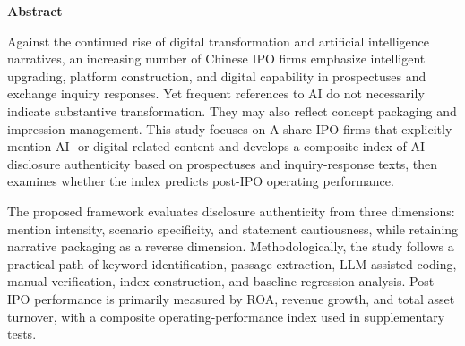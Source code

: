 \begin{abstract}
在数字化转型与人工智能热潮持续升温的背景下，越来越多 IPO 企业在招股说明书和交易所问询回复中强调自身的智能化、平台化与数字化能力。然而，企业对 AI 与数字化的高频表述究竟反映了真实转型能力，还是更多体现为概念化包装和叙事修辞，仍缺乏细化识别。围绕这一问题，本文拟以 A 股 IPO 企业中明确提及 AI 或数字化内容的企业为研究对象，结合招股说明书与问询回复文本，构建企业 AI 相关披露真实性综合指数，并检验其对上市后经营表现的影响。

具体而言，本文从提及强度、场景具体性和表述审慎性三个维度刻画企业 AI 披露的真实性，并保留叙事包装性这一反向面向，形成“真实性-包装性”双面识别框架。方法上，本文采用“关键词识别-相关段落抽取-LLM 辅助标注-人工复核-指数构建-基础回归验证”的技术路线，其中 LLM 主要承担摘要、标签建议与初步评分任务，关键标签由人工复核确认。经营表现主要从 ROA、营业收入增长率和总资产周转率三个维度衡量，并进一步构建综合经营表现指标进行补充分析。

本文的潜在贡献主要体现在三个方面：第一，将研究窗口前移至 IPO 阶段，讨论企业 AI 叙事究竟是真实能力信号还是包装性表达；第二，提出一套适用于公开披露文本的轻量化真实性识别框架；第三，为投资者识别概念包装、为监管部门理解 IPO 企业相关披露质量、为企业规范数字化叙事提供参考。

\noindent\textbf{关键词：}IPO；人工智能披露；数字化转型；叙事包装；经营表现
\end{abstract}

\begin{center}
\textbf{Abstract}
\end{center}

Against the continued rise of digital transformation and artificial intelligence narratives, an increasing number of Chinese IPO firms emphasize intelligent upgrading, platform construction, and digital capability in prospectuses and exchange inquiry responses. Yet frequent references to AI do not necessarily indicate substantive transformation. They may also reflect concept packaging and impression management. This study focuses on A-share IPO firms that explicitly mention AI- or digital-related content and develops a composite index of AI disclosure authenticity based on prospectuses and inquiry-response texts, then examines whether the index predicts post-IPO operating performance.

The proposed framework evaluates disclosure authenticity from three dimensions: mention intensity, scenario specificity, and statement cautiousness, while retaining narrative packaging as a reverse dimension. Methodologically, the study follows a practical path of keyword identification, passage extraction, LLM-assisted coding, manual verification, index construction, and baseline regression analysis. Post-IPO performance is primarily measured by ROA, revenue growth, and total asset turnover, with a composite operating-performance index used in supplementary tests.

